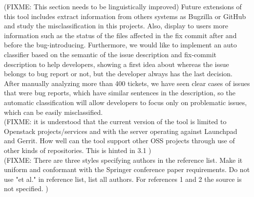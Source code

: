 \documentclass[ifip]{svmult}
\begin{document}
(FIXME: This section needs to be linguistically improved)
Future extensions of this tool includes extract information from others systems as Bugzilla or GitHub and study the misclassification in this projects. Also, display to users more information such as the status of the files affected in the fix commit after and before the bug-introducing. Furthermore, we would like to implement an auto classifier based on the semantic of the issue description and fix-commit description to help developers, showing a first idea about whereas the issue belongs to bug report or not, but the developer always has the last decision. After manually analyzing more than 400 tickets, we have seen clear cases of issues that were bug reports, which have similar sentences in the description, so the automatic classification will allow developers to focus only on problematic issues, which can be easily misclassified. \\
(FIXME: it is understood that the current version of the tool is limited to Openstack projects/services and with the server operating against Launchpad and Gerrit. How well can the tool support other OSS projects through use of other kinds of repositories. This is hinted in 3.1 )\\
(FIXME: There are three styles specifying authors in the reference list. Make it uniform and conformant with the Springer conference paper requirements. Do not use "et al." in reference list, list all authors. For references 1 and 2 the source is not specified.
)



\end{document}
